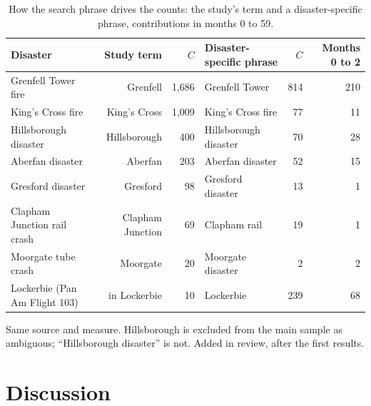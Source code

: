 \documentclass[11pt,a4paper]{article}
\begin{document}
\begin{table}[tbp]\centering\small\begin{threeparttable}\caption{How the search phrase drives the counts: the study's term and a disaster-specific phrase, contributions in months 0 to 59.}\label{tab:phrase}\begin{tabular}{lrrlrr}\toprule Disaster & Study term & $C$ & Disaster-specific phrase & $C$ & Months 0 to 2\\\midrule
Grenfell Tower fire & Grenfell & 1,686 & Grenfell Tower & 814 & 210\\
King's Cross fire & King's Cross & 1,009 & King's Cross fire & 77 & 11\\
Hillsborough disaster & Hillsborough & 400 & Hillsborough disaster & 70 & 28\\
Aberfan disaster & Aberfan & 203 & Aberfan disaster & 52 & 15\\
Gresford disaster & Gresford & 98 & Gresford disaster & 13 & 1\\
Clapham Junction rail crash & Clapham Junction & 69 & Clapham rail & 19 & 1\\
Moorgate tube crash & Moorgate & 20 & Moorgate disaster & 2 & 2\\
Lockerbie (Pan Am Flight 103) & in Lockerbie & 10 & Lockerbie & 239 & 68\\
\bottomrule\end{tabular}\begin{tablenotes}\footnotesize\item Same source and measure. Hillsborough is excluded from the main sample as ambiguous; ``Hillsborough disaster'' is not. Added in review, after the first results.\end{tablenotes}\end{threeparttable}\end{table}

\section{Discussion}
\label{sec:discussion}
\end{document}

